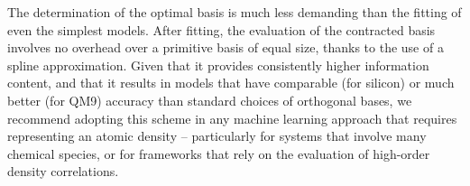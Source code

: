 The determination of the optimal basis is much less demanding than the fitting of even the simplest models. After fitting, the evaluation of the contracted basis involves no overhead over a primitive basis of equal size, thanks to the use of a spline approximation.
Given that it provides consistently higher information content, and that it results in models that have comparable (for silicon) or much better (for QM9) accuracy than standard choices of orthogonal bases, we recommend adopting this scheme in any machine learning approach that requires representing an atomic density -- particularly for systems that involve many chemical species, or for frameworks that rely on the evaluation of high-order density correlations.

